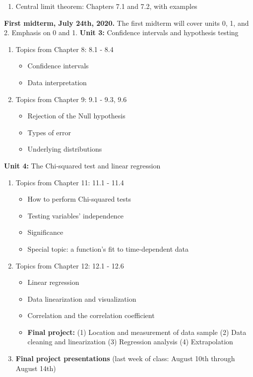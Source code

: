\documentclass[10pt]{article}
\begin{document}
\begin{outline}[enumerate]
\begin{enumerate}
\item Central limit theorem: Chapters 7.1 and 7.2, with examples
\end{enumerate}
\1 \textbf{First midterm, July 24th, 2020.} The first midterm will cover units 0, 1, and 2. Emphasis on 0 and 1.
\1 \textbf{Unit 3:} Confidence intervals and hypothesis testing
\begin{enumerate}
\item Topics from Chapter 8: 8.1 - 8.4
\begin{itemize}
\item Confidence intervals
\item Data interpretation
\end{itemize}
\item Topics from Chapter 9: 9.1 - 9.3, 9.6
\begin{itemize}
\item Rejection of the Null hypothesis
\item Types of error
\item Underlying distributions
\end{itemize}
\end{enumerate}
\1 \textbf{Unit 4:} The Chi-squared test and linear regression
\begin{enumerate}
\item Topics from Chapter 11: 11.1 - 11.4
\begin{itemize}
\item How to perform Chi-squared tests
\item Testing variables' independence
\item Significance
\item Special topic: a function's fit to time-dependent data
\end{itemize} 
\item Topics from Chapter 12: 12.1 - 12.6
\begin{itemize}
\item Linear regression
\item Data linearization and visualization
\item Correlation and the correlation coefficient
\item \textbf{Final project:} (1) Location and measurement of data sample (2) Data cleaning and linearization (3) Regression analysis (4) Extrapolation
\end{itemize}
\item \textbf{Final project presentations} (last week of class: August 10th through August 14th)
\end{enumerate}

\end{outline}
\end{document}
